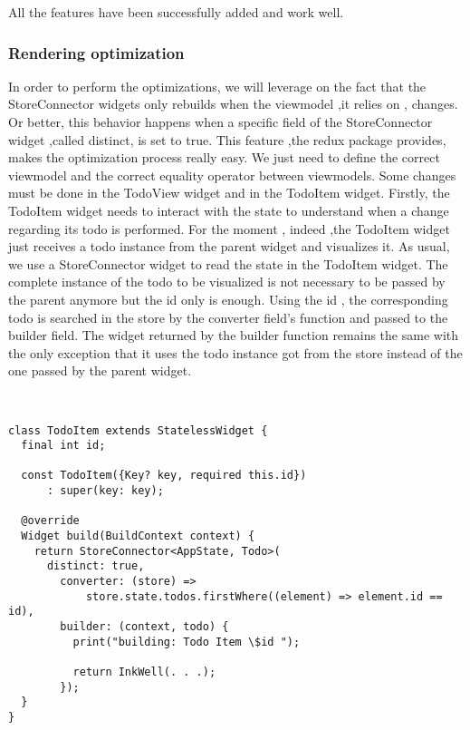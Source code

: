 All the features have been successfully added and work well.
\subsubsection{Rendering optimization}  \label{par:todo_app_inherited_widget_introduction}

In order to perform the optimizations, we will leverage on the fact that the StoreConnector widgets only rebuilds when the viewmodel ,it relies on , changes. Or better, this behavior happens when a specific field of the StoreConnector widget ,called distinct, is set to true. This feature ,the redux package provides, makes the optimization process really easy. We just need to define the correct viewmodel and the correct equality operator between viewmodels. Some changes must be done in the TodoView widget and in the TodoItem widget. Firstly, the TodoItem widget needs to interact with the state to understand when a change regarding its todo is performed. For the moment , indeed ,the TodoItem widget just receives a todo instance from the parent widget and visualizes it. As usual, we use a StoreConnector widget to read the state in the TodoItem widget. The complete instance of the todo to be visualized is not necessary to be passed by the parent anymore but the id only is enough. Using the id , the corresponding todo is searched in the store by the converter field’s function and passed to the builder field. The widget returned by the builder function remains the same with the only exception that it uses the todo instance got from the store instead of the one passed by the parent widget. 
\begin{code}
\mbox{}\\
 \mbox{}
		\label{code:2.14}
\begin{verbatim}
class TodoItem extends StatelessWidget {
  final int id;

  const TodoItem({Key? key, required this.id})
      : super(key: key);

  @override
  Widget build(BuildContext context) {
    return StoreConnector<AppState, Todo>(
      distinct: true,
        converter: (store) =>
            store.state.todos.firstWhere((element) => element.id == id),
        builder: (context, todo) {
          print("building: Todo Item \$id ");

          return InkWell(. . .);
        });
  }
}
\end{verbatim}
\mbox{}
\end{code}

